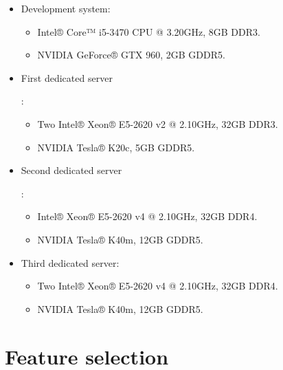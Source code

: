 		\begin{itemize}

			\item
			Development system:

			\begin{itemize}

				\item
				Intel® Core™ i5-3470 CPU @ 3.20GHz, 8GB DDR3.
				\item
				NVIDIA GeForce® GTX 960, 2GB GDDR5.

			\end{itemize}

			\item
			\hypertarget{server:firstserver}{First dedicated server}:

			\begin{itemize}

				\item
				Two Intel® Xeon® E5-2620 v2 @ 2.10GHz, 32GB DDR3.
				\item
				NVIDIA Tesla® K20c, 5GB GDDR5.

			\end{itemize}

			\item
			\hypertarget{server:secondserver}{Second dedicated server}:

			\begin{itemize}

				\item
				Intel® Xeon® E5-2620 v4 @ 2.10GHz, 32GB DDR4.
				\item
				NVIDIA Tesla® K40m, 12GB GDDR5.

			\end{itemize}

			\item
			Third dedicated server:

			\begin{itemize}

				\item
				Two Intel® Xeon® E5-2620 v4 @ 2.10GHz, 32GB DDR4.
				\item
				NVIDIA Tesla® K40m, 12GB GDDR5.

			\end{itemize}

		\end{itemize}

\newpage

\section{Feature selection}\label{sec:res_fs}

